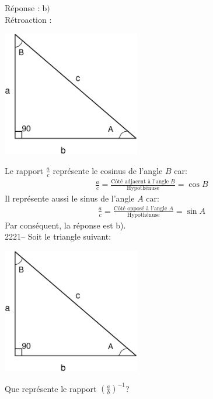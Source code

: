 \documentclass[letterpaper, 12pt]{article}
\begin{document}
R\'eponse : b$)$\\

R\'etroaction :\\
\begin{center}
 \includegraphics[width=6cm,bb=14 14 591 533]{Triangle_rectangle2.eps}
\end{center}
Le rapport $\frac{a}{c}$ repr\'esente le cosinus de l'angle $B$ car:
\begin{eqnarray*}
 \frac{a}{c}=\frac{\textrm{C\^ot\'e adjacent \`a l'angle $B$}}{\textrm{Hypoth\'enuse}}=\cos{B}
\end{eqnarray*}
Il repr\'esente aussi le sinus de l'angle $A$ car:
\begin{eqnarray*}
 \frac{a}{c}=\frac{\textrm{C\^ot\'e oppos\'e \`a l'angle $A$}}{\textrm{Hypoth\'enuse}}=\sin{A}
\end{eqnarray*}
Par cons\'equent, la r\'eponse est b).\\

2221-- Soit le triangle suivant: \\
\begin{center}
 \includegraphics[width=6cm,bb=14 14 591 533]{Triangle_rectangle2.eps}
\end{center}
Que repr\'esente le rapport $\left( \frac{a}{b}\right) ^{-1}$?\\
\end{document}
